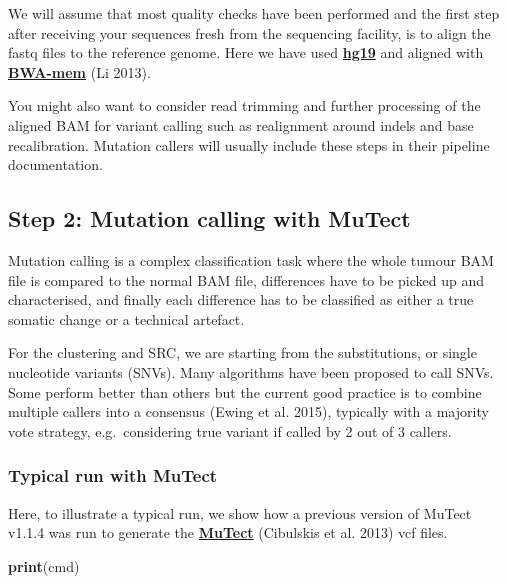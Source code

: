 \documentclass[]{article}
\newenvironment{Shaded}{\begin{snugshade}}{\end{snugshade}}
\newcommand{\KeywordTok}[1]{\textcolor[rgb]{0.13,0.29,0.53}{\textbf{#1}}}
\newcommand{\NormalTok}[1]{#1}
\begin{document}
We will assume that most quality checks have been performed and the
first step after receiving your sequences fresh from the sequencing
facility, is to align the fastq files to the reference genome. Here we
have used
\href{http://ftp.1000genomes.ebi.ac.uk/vol1/ftp/technical/reference/phase2_reference_assembly_sequence/hs37d5.fa.gz}{\textbf{hg19}}
and aligned with \href{https://github.com/lh3/bwa}{\textbf{BWA-mem}} (Li
2013).

You might also want to consider read trimming and further processing of
the aligned BAM for variant calling such as realignment around indels
and base recalibration. Mutation callers will usually include these
steps in their pipeline documentation.

\hypertarget{step-2-mutation-calling-with-mutect}{%
\subsection{Step 2: Mutation calling with
MuTect}\label{step-2-mutation-calling-with-mutect}}

Mutation calling is a complex classification task where the whole tumour
BAM file is compared to the normal BAM file, differences have to be
picked up and characterised, and finally each difference has to be
classified as either a true somatic change or a technical artefact.

For the clustering and SRC, we are starting from the substitutions, or
single nucleotide variants (SNVs). Many algorithms have been proposed to
call SNVs. Some perform better than others but the current good practice
is to combine multiple callers into a consensus (Ewing et al. 2015),
typically with a majority vote strategy, e.g.~considering true variant
if called by 2 out of 3 callers.

\hypertarget{typical-run-with-mutect}{%
\subsubsection{Typical run with MuTect}\label{typical-run-with-mutect}}

Here, to illustrate a typical run, we show how a previous version of
MuTect v1.1.4 was run to generate the
\href{https://software.broadinstitute.org/cancer/cga/mutect_download}{\textbf{MuTect}}
(Cibulskis et al. 2013) vcf files.

\begin{Shaded}
\begin{Highlighting}[]
\KeywordTok{print}\NormalTok{(cmd)}
\end{Highlighting}
\end{Shaded}
\end{document}
